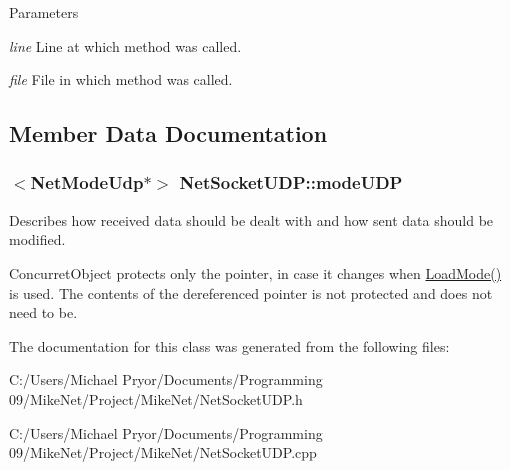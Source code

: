 \begin{DoxyParams}{Parameters}
\item[{\em line}]Line at which method was called. \item[{\em file}]File in which method was called. \end{DoxyParams}


\subsection{Member Data Documentation}
\hypertarget{class_net_socket_u_d_p_a7b3a3c5ab9bb5b78f66fe5fe50164df1}{
\subsubsection[{modeUDP}]{$<${\bf NetModeUdp}$\ast$$>$ {\bf NetSocketUDP::modeUDP}}}
\label{class_net_socket_u_d_p_a7b3a3c5ab9bb5b78f66fe5fe50164df1}


Describes how received data should be dealt with and how sent data should be modified. 

ConcurretObject protects only the pointer, in case it changes when \hyperlink{class_net_socket_u_d_p_af077cea62da3567d90f68c2ddeecb023}{LoadMode()} is used. The contents of the dereferenced pointer is not protected and does not need to be. 

The documentation for this class was generated from the following files:\begin{DoxyCompactItemize}
\item 
C:/Users/Michael Pryor/Documents/Programming 09/MikeNet/Project/MikeNet/NetSocketUDP.h\item 
C:/Users/Michael Pryor/Documents/Programming 09/MikeNet/Project/MikeNet/NetSocketUDP.cpp\end{DoxyCompactItemize}
